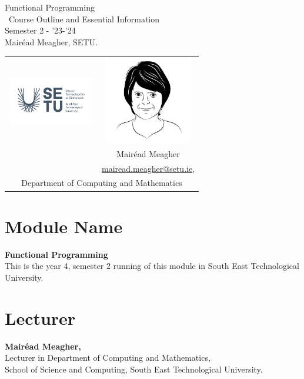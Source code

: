 \documentclass{article}
\author{Mair\'ead Meagher, SETU}
\newcommand\ExTitle{\ Course Outline and Essential Information}
\newcommand\fullExTitle{Functional Programming
\\ \ExTitle \\Semester 2 - '23-'24 }
\begin{document}
\begin{Huge}
	\begin{center}
	\fullExTitle \\
    \vspace{.1cm}
    Mair\'ead Meagher, SETU.
    \end{center}
\end{Huge}
\begin{center}
    \begin{tabular}{|c |  c | }
 
    \hline
    \includegraphics[width=1.5in]{img/RGB.png} &          \includegraphics[width=1.5in]{img/mairead-avatar.jpeg} \\ 

   
    
        & Mair\'ead Meagher  \\  
       & \href{mailto:mmeagher@wit.ie}{mairead.meagher@setu.ie}, \\

    \hline
    \multicolumn{2}{|c|}{Department of Computing and Mathematics} \\
     \hline

  
    \end{tabular}
\end{center}

\tableofcontents
\pagebreak
\section{Module Name}   
\Large{ \textbf{Functional Programming} }\\
This is the year 4, semester 2 running of this module in South East Technological University. 
\section{Lecturer}
\Large{ \textbf{Mair\'ead Meagher,}} \\
Lecturer in Department of Computing and Mathematics, \\
School of Science and Computing,
South East Technological University.
\end{document}
